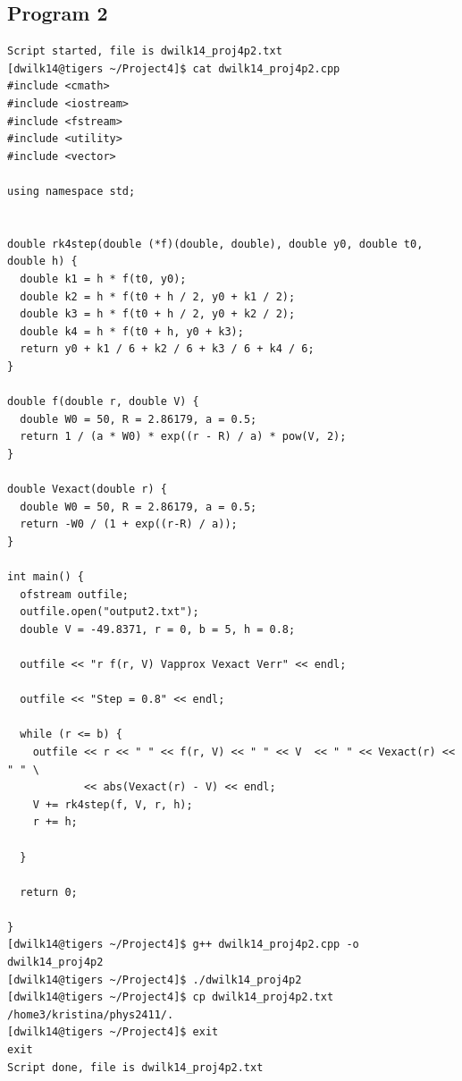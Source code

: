 \documentclass{article}
\begin{document}
\subsection*{Program 2}
\begin{verbatim}
Script started, file is dwilk14_proj4p2.txt
[dwilk14@tigers ~/Project4]$ cat dwilk14_proj4p2.cpp
#include <cmath>
#include <iostream>
#include <fstream>
#include <utility>
#include <vector>

using namespace std;


double rk4step(double (*f)(double, double), double y0, double t0, double h) {
  double k1 = h * f(t0, y0);
  double k2 = h * f(t0 + h / 2, y0 + k1 / 2);
  double k3 = h * f(t0 + h / 2, y0 + k2 / 2);
  double k4 = h * f(t0 + h, y0 + k3);
  return y0 + k1 / 6 + k2 / 6 + k3 / 6 + k4 / 6;
}

double f(double r, double V) {
  double W0 = 50, R = 2.86179, a = 0.5;
  return 1 / (a * W0) * exp((r - R) / a) * pow(V, 2);
}

double Vexact(double r) {
  double W0 = 50, R = 2.86179, a = 0.5;
  return -W0 / (1 + exp((r-R) / a));
}

int main() {
  ofstream outfile;
  outfile.open("output2.txt");
  double V = -49.8371, r = 0, b = 5, h = 0.8;

  outfile << "r f(r, V) Vapprox Vexact Verr" << endl;

  outfile << "Step = 0.8" << endl;
  
  while (r <= b) {
    outfile << r << " " << f(r, V) << " " << V  << " " << Vexact(r) << " " \
            << abs(Vexact(r) - V) << endl;
    V += rk4step(f, V, r, h);
    r += h;

  } 

  return 0;

}
[dwilk14@tigers ~/Project4]$ g++ dwilk14_proj4p2.cpp -o dwilk14_proj4p2
[dwilk14@tigers ~/Project4]$ ./dwilk14_proj4p2
[dwilk14@tigers ~/Project4]$ cp dwilk14_proj4p2.txt /home3/kristina/phys2411/.
[dwilk14@tigers ~/Project4]$ exit
exit
Script done, file is dwilk14_proj4p2.txt
\end{verbatim}
 
\end{document}
